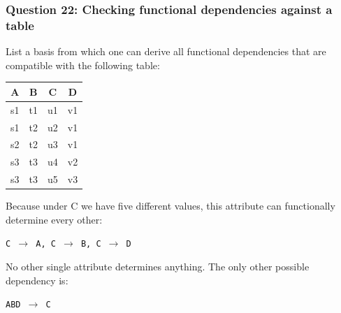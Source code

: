 {\color{red}
\subsubsection{Question 22: Checking functional dependencies against a table}
}
List a basis from which one can derive all functional dependencies that are compatible with the following table:

\begin{center}
\begin{tabular}{|c|c|c|c|}
\hline
A & B & C & D \\
\hline
s1 & t1 & u1 & v1 \\
s1 & t2 & u2 & v1 \\
s2 & t2 & u3 & v1 \\
s3 & t3 & u4 & v2 \\
s3 & t3 & u5 & v3 \\
\hline
\end{tabular}
\end{center}

Because under C we have five different values, this attribute can functionally determine every other:

\texttt{C $\rightarrow$ A, C $\rightarrow$ B, C $\rightarrow$ D}

No other single attribute determines anything. The only other possible dependency is:

\texttt{ABD $\rightarrow$ C}
